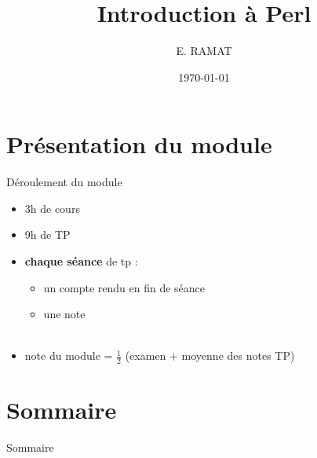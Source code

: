 \documentclass[sans, mathsans, professionalfonts, compress, smaller, table,
               xcolor=pdftex, dvipsnames]{beamer}
\title[Erlang]{Introduction à Perl}
\subtitle{}
\author[E. Ramat]{E. RAMAT}
\institute[ULCO]{Université du Littoral - Côte d'Opale}
\date{\today}
\begin{document}
\begin{frame}
  \titlepage
\end{frame}

\section*{Présentation du module}
\begin{frame}{Déroulement du module}
  \begin{itemize}
  \item 3h de cours
  \item 9h de TP
  \item \textbf{chaque séance} de tp :
    \begin{itemize}
    \item un compte rendu en fin de séance
    \item une note\\~
    \end{itemize}
  \item note du module = ${\frac{1}{2}}$ (examen + moyenne des notes TP)
  \end{itemize}
\end{frame}

\section*{Sommaire}
\begin{frame}{Sommaire}
\tableofcontents
\end{frame}












\end{document}
